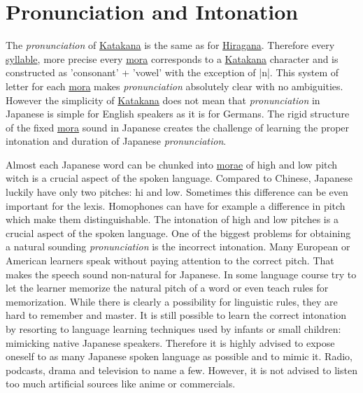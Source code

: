 \section{Pronunciation and Intonation}
\label{sec:PronunciationAndIntonation}
\label{sec:Pronuciation}
\label{sec:Intonation}

The \textit{pronunciation} of \hyperref[sec:Katakana]{Katakana} is the same as
for \hyperref[sec:Hiragana]{Hiragana}. Therefore every
\hyperref[sec:Syllable]{syllable}, more precise every \hyperref[sec:Mora]{mora}
corresponds to a \hyperref[sec:Katakana]{Katakana} character and is constructed
as 'consonant' + 'vowel' with the exception of |n|. This system of letter for
each \hyperref[sec:Mora]{mora} makes \textit{pronunciation} absolutely clear
with no ambiguities.  However the simplicity of
\hyperref[sec:Katakana]{Katakana} does not mean that \textit{pronunciation} in
Japanese is simple for English speakers as it is for Germans.  The rigid
structure of the fixed \hyperref[sec:Mora]{mora} sound in Japanese creates the
challenge of learning the proper intonation and duration of Japanese
\textit{pronunciation}.

Almost each Japanese word can be chunked into \hyperref[sec:Mora]{morae} of
high and low pitch witch is a crucial aspect of the spoken language. Compared
to Chinese, Japanese luckily have only two pitches: hi and low. Sometimes this
difference can be even important for the lexis. Homophones can have for example
a difference in pitch which make them distinguishable.  The intonation of high
and low pitches is a crucial aspect of the spoken language. One of the biggest
problems for obtaining a natural sounding \textit{pronunciation} is the
incorrect intonation. Many European or American learners speak without paying
attention to the correct pitch. That makes the speech sound non-natural for
Japanese. In some language course try to let the learner memorize the natural
pitch of a word or even teach rules for memorization. While there is clearly a
possibility for linguistic rules, they are hard to remember and master.
It is still possible to learn the correct
intonation by resorting to language learning techniques used by infants or
small children: mimicking native Japanese speakers. Therefore it is highly
advised to expose oneself to as many Japanese spoken language as possible and
to mimic it. Radio, podcasts, drama and television to name a few. However, it
is not advised to listen too much artificial sources like anime or commercials.

